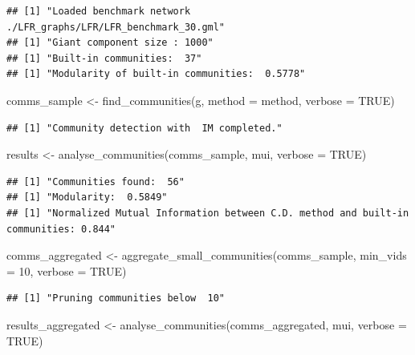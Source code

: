 \documentclass[
]{article}
\newenvironment{Shaded}{\begin{snugshade}}{\end{snugshade}}
\newcommand{\AttributeTok}[1]{\textcolor[rgb]{0.77,0.63,0.00}{#1}}
\newcommand{\ConstantTok}[1]{\textcolor[rgb]{0.00,0.00,0.00}{#1}}
\newcommand{\DecValTok}[1]{\textcolor[rgb]{0.00,0.00,0.81}{#1}}
\newcommand{\FunctionTok}[1]{\textcolor[rgb]{0.00,0.00,0.00}{#1}}
\newcommand{\NormalTok}[1]{#1}
\newcommand{\OtherTok}[1]{\textcolor[rgb]{0.56,0.35,0.01}{#1}}
\begin{document}
\begin{verbatim}
## [1] "Loaded benchmark network ./LFR_graphs/LFR/LFR_benchmark_30.gml"
## [1] "Giant component size : 1000"
## [1] "Built-in communities:  37"
## [1] "Modularity of built-in communities:  0.5778"
\end{verbatim}

\begin{Shaded}
\begin{Highlighting}[]
\NormalTok{comms\_sample }\OtherTok{\textless{}{-}} \FunctionTok{find\_communities}\NormalTok{(g, }\AttributeTok{method =}\NormalTok{ method, }\AttributeTok{verbose =} \ConstantTok{TRUE}\NormalTok{)}
\end{Highlighting}
\end{Shaded}

\begin{verbatim}
## [1] "Community detection with  IM completed."
\end{verbatim}

\begin{Shaded}
\begin{Highlighting}[]
\NormalTok{results }\OtherTok{\textless{}{-}} \FunctionTok{analyse\_communities}\NormalTok{(comms\_sample, mui, }\AttributeTok{verbose =} \ConstantTok{TRUE}\NormalTok{)}
\end{Highlighting}
\end{Shaded}

\begin{verbatim}
## [1] "Communities found:  56"
## [1] "Modularity:  0.5849"
## [1] "Normalized Mutual Information between C.D. method and built-in communities: 0.844"
\end{verbatim}

\begin{Shaded}
\begin{Highlighting}[]
\NormalTok{comms\_aggregated }\OtherTok{\textless{}{-}} \FunctionTok{aggregate\_small\_communities}\NormalTok{(comms\_sample, }\AttributeTok{min\_vids =} \DecValTok{10}\NormalTok{, }\AttributeTok{verbose =} \ConstantTok{TRUE}\NormalTok{)}
\end{Highlighting}
\end{Shaded}

\begin{verbatim}
## [1] "Pruning communities below  10"
\end{verbatim}

\begin{Shaded}
\begin{Highlighting}[]
\NormalTok{results\_aggregated }\OtherTok{\textless{}{-}} \FunctionTok{analyse\_communities}\NormalTok{(comms\_aggregated, mui, }\AttributeTok{verbose =} \ConstantTok{TRUE}\NormalTok{)}
\end{Highlighting}
\end{Shaded}
\end{document}
